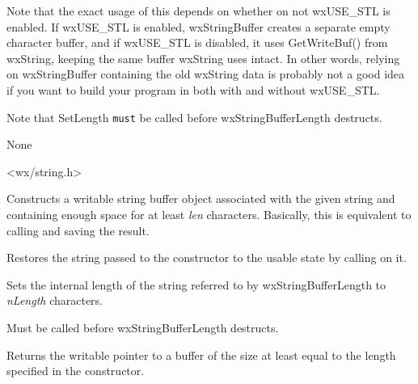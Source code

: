 Note that the exact usage of this depends on whether on not wxUSE\_STL is enabled.  If
wxUSE\_STL is enabled, wxStringBuffer creates a separate empty character buffer, and
if wxUSE\_STL is disabled, it uses GetWriteBuf() from wxString, keeping the same buffer
wxString uses intact.  In other words, relying on wxStringBuffer containing the old 
wxString data is probably not a good idea if you want to build your program in both
with and without wxUSE\_STL.

Note that SetLength {\tt must} be called before wxStringBufferLength destructs.


None


<wx/string.h>


\label{wxstringbufferlengthctor}


Constructs a writable string buffer object associated with the given string
and containing enough space for at least {\it len} characters. Basically, this
is equivalent to calling  and
saving the result.

\label{wxstringbufferlengthdtor}


Restores the string passed to the constructor to the usable state by calling 
 on it.

\label{wxstringbufferlengthsetlength}


Sets the internal length of the string referred to by wxStringBufferLength to 
{\it nLength} characters.

Must be called before wxStringBufferLength destructs.

\label{wxstringbufferlengthwxchar}


Returns the writable pointer to a buffer of the size at least equal to the
length specified in the constructor.


